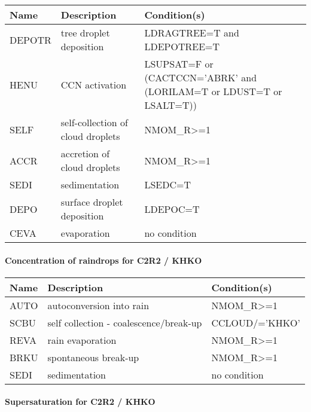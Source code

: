 \begin{longtable} {|p{}|p{}|p{}|}
\hline
Name & Description & Condition(s) \\
\hline \hline
DEPOTR & tree droplet deposition           & LDRAGTREE=T and LDEPOTREE=T \\\hline
HENU   & CCN activation                    & LSUPSAT=F or (CACTCCN='ABRK' and (LORILAM=T or LDUST=T or LSALT=T)) \\\hline
SELF   & self-collection of cloud droplets & NMOM\_R>=1 \\\hline
ACCR   & accretion of cloud droplets       & NMOM\_R>=1 \\\hline
SEDI   & sedimentation                     & LSEDC=T \\\hline
DEPO   & surface droplet deposition        & LDEPOC=T \\\hline
CEVA   & evaporation                       & no condition \\\hline
\endhead
\end{longtable}

\paragraph{Concentration of raindrops for C2R2 / KHKO}
\mbox{} %

\begin{longtable} {|p{}|p{}|p{}|}
\hline
Name & Description & Condition(s) \\
\hline \hline
AUTO   & autoconversion into rain               & NMOM\_R>=1        \\\hline
SCBU   & self collection - coalescence/break-up & CCLOUD/='KHKO' \\\hline
REVA   & rain evaporation                       & NMOM\_R>=1        \\\hline
BRKU   & spontaneous break-up                   & NMOM\_R>=1        \\\hline
SEDI   & sedimentation                          & no condition   \\\hline
\endhead
\end{longtable}

\paragraph{Supersaturation for C2R2 / KHKO}
\mbox{} %

